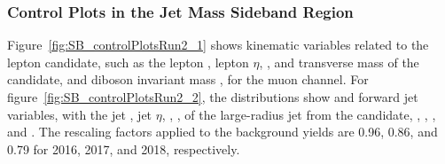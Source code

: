 \subsubsection{Control Plots in the Jet Mass Sideband Region}

Figure~\ref{fig:SB_controlPlotsRun2_1} shows kinematic variables related to the lepton candidate, such as the lepton \pt, lepton $\eta$, \ptmiss, \pt and transverse mass of the \Wlep candidate, and diboson invariant mass \MVV, for the muon channel.
For figure~\ref{fig:SB_controlPlotsRun2_2}, the distributions show \Vhad and \VBF forward jet variables, with the jet \pt, jet $\eta$, \MJ, \nsubjDDT, \DoubleB of the large-radius jet from the \Vhad candidate, \DetaVBF, \mjjVBF, \nJets, and \Dy.
The rescaling factors applied to the \Wjets background yields are 0.96, 0.86, and 0.79 for 2016, 2017, and 2018, respectively.

